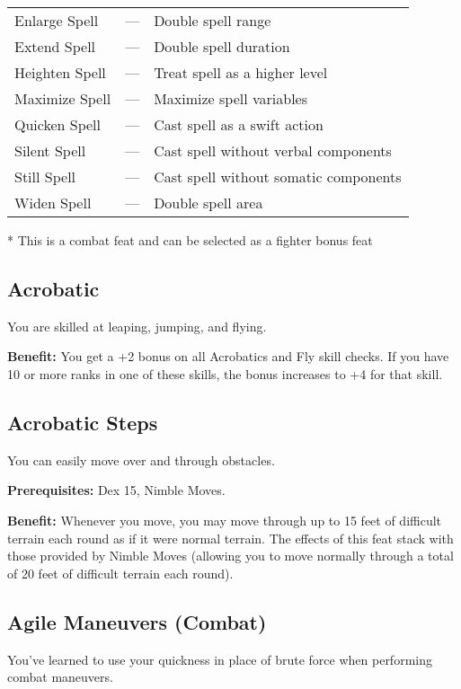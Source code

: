 \begin{table*}[]
\begin{tabularx}{\linewidth}{lXl}
Enlarge Spell & --- & Double spell range\\
Extend Spell & --- & Double spell duration\\
Heighten Spell & --- & Treat spell as a higher level\\
Maximize Spell & --- & Maximize spell variables\\
Quicken Spell & --- & Cast spell as a swift action\\
Silent Spell & --- & Cast spell without verbal components\\
Still Spell & --- & Cast spell without somatic components\\
Widen Spell & --- & Double spell area\\
\end{tabularx}
* This is a combat feat and can be selected as a fighter bonus feat
\end{table*}

				
\subsection{Acrobatic}

				
You are skilled at leaping, jumping, and flying.
				
\textbf{Benefit:} You get a +2 bonus on all Acrobatics and Fly skill checks. If you have 10 or more ranks in one of these skills, the bonus increases to +4 for that skill.
				
\subsection{Acrobatic Steps}

				
You can easily move over and through obstacles.
				
\textbf{Prerequisites:} Dex 15, Nimble Moves.
				
\textbf{Benefit:} Whenever you move, you may move through up to 15 feet of difficult terrain each round as if it were normal terrain. The effects of this feat stack with those provided by Nimble Moves (allowing you to move normally through a total of 20 feet of difficult terrain each round).
				
\subsection{Agile Maneuvers (Combat)}

				
You've learned to use your quickness in place of brute force when performing combat maneuvers.
				
